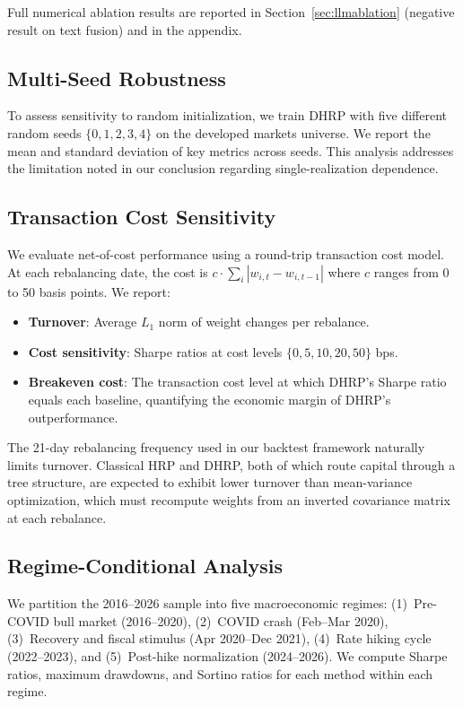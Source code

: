 Full numerical ablation results are reported in Section~\ref{sec:llmablation} (negative result on text fusion) and in the appendix.

\subsection{Multi-Seed Robustness}

To assess sensitivity to random initialization, we train DHRP with five different random seeds $\{0, 1, 2, 3, 4\}$ on the developed markets universe. We report the mean and standard deviation of key metrics across seeds. This analysis addresses the limitation noted in our conclusion regarding single-realization dependence.

\subsection{Transaction Cost Sensitivity}

We evaluate net-of-cost performance using a round-trip transaction cost model. At each rebalancing date, the cost is $c \cdot \sum_i |w_{i,t} - w_{i,t-1}|$ where $c$ ranges from 0 to 50 basis points. We report:
\begin{itemize}
\item \textbf{Turnover}: Average $L_1$ norm of weight changes per rebalance.
\item \textbf{Cost sensitivity}: Sharpe ratios at cost levels $\{0, 5, 10, 20, 50\}$ bps.
\item \textbf{Breakeven cost}: The transaction cost level at which DHRP's Sharpe ratio equals each baseline, quantifying the economic margin of DHRP's outperformance.
\end{itemize}

The 21-day rebalancing frequency used in our backtest framework naturally limits turnover. Classical HRP and DHRP, both of which route capital through a tree structure, are expected to exhibit lower turnover than mean-variance optimization, which must recompute weights from an inverted covariance matrix at each rebalance.

\subsection{Regime-Conditional Analysis}

We partition the 2016--2026 sample into five macroeconomic regimes: (1)~Pre-COVID bull market (2016--2020), (2)~COVID crash (Feb--Mar 2020), (3)~Recovery and fiscal stimulus (Apr 2020--Dec 2021), (4)~Rate hiking cycle (2022--2023), and (5)~Post-hike normalization (2024--2026). We compute Sharpe ratios, maximum drawdowns, and Sortino ratios for each method within each regime.

